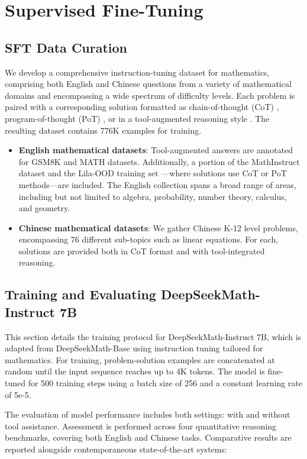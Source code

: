 \section{Supervised Fine-Tuning}

\subsection{SFT Data Curation}

We develop a comprehensive instruction-tuning dataset for mathematics, comprising both English and Chinese questions from a variety of mathematical domains and encompassing a wide spectrum of difficulty levels. Each problem is paired with a corresponding solution formatted as chain-of-thought (CoT) \citep{cot}, program-of-thought (PoT) \citep{pot,pal}, or in a tool-augmented reasoning style \citep{tora}. The resulting dataset contains 776K examples for training.

\begin{itemize}[topsep=0pt]
    \item \textbf{English mathematical datasets}: Tool-augmented answers are annotated for GSM8K and MATH datasets. Additionally, a portion of the MathInstruct dataset \citep{MathInstruct} and the Lila-OOD training set \citep{lila}—where solutions use CoT or PoT methods—are included. The English collection spans a broad range of areas, including but not limited to algebra, probability, number theory, calculus, and geometry.
    \item \textbf{Chinese mathematical datasets}: We gather Chinese K-12 level problems, encompassing 76 different sub-topics such as linear equations. For each, solutions are provided both in CoT format and with tool-integrated reasoning.
\end{itemize}

\subsection{Training and Evaluating DeepSeekMath-Instruct 7B}

This section details the training protocol for DeepSeekMath-Instruct 7B, which is adapted from DeepSeekMath-Base using instruction tuning tailored for mathematics. For training, problem-solution examples are concatenated at random until the input sequence reaches up to 4K tokens. The model is fine-tuned for 500 training steps using a batch size of 256 and a constant learning rate of 5e-5.

The evaluation of model performance includes both settings: with and without tool assistance. Assessment is performed across four quantitative reasoning benchmarks, covering both English and Chinese tasks. Comparative results are reported alongside contemporaneous state-of-the-art systems:

